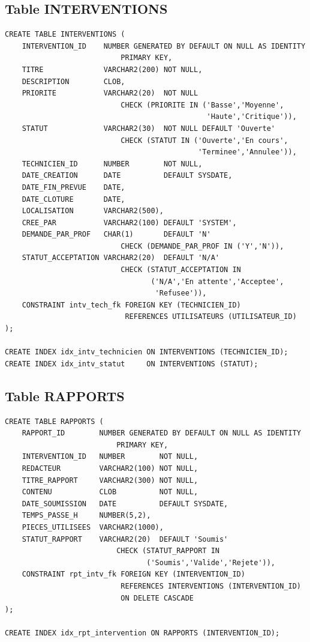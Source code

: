\documentclass[12pt,a4paper,oneside]{report}
\begin{document}
\subsection{Table INTERVENTIONS}

\begin{lstlisting}[language=PLSQL, caption=Création de la table INTERVENTIONS]
CREATE TABLE INTERVENTIONS (
    INTERVENTION_ID    NUMBER GENERATED BY DEFAULT ON NULL AS IDENTITY
                           PRIMARY KEY,
    TITRE              VARCHAR2(200) NOT NULL,
    DESCRIPTION        CLOB,
    PRIORITE           VARCHAR2(20)  NOT NULL
                           CHECK (PRIORITE IN ('Basse','Moyenne',
                                               'Haute','Critique')),
    STATUT             VARCHAR2(30)  NOT NULL DEFAULT 'Ouverte'
                           CHECK (STATUT IN ('Ouverte','En cours',
                                             'Terminee','Annulee')),
    TECHNICIEN_ID      NUMBER        NOT NULL,
    DATE_CREATION      DATE          DEFAULT SYSDATE,
    DATE_FIN_PREVUE    DATE,
    DATE_CLOTURE       DATE,
    LOCALISATION       VARCHAR2(500),
    CREE_PAR           VARCHAR2(100) DEFAULT 'SYSTEM',
    DEMANDE_PAR_PROF   CHAR(1)       DEFAULT 'N'
                           CHECK (DEMANDE_PAR_PROF IN ('Y','N')),
    STATUT_ACCEPTATION VARCHAR2(20)  DEFAULT 'N/A'
                           CHECK (STATUT_ACCEPTATION IN
                                  ('N/A','En attente','Acceptee',
                                   'Refusee')),
    CONSTRAINT intv_tech_fk FOREIGN KEY (TECHNICIEN_ID)
                            REFERENCES UTILISATEURS (UTILISATEUR_ID)
);

CREATE INDEX idx_intv_technicien ON INTERVENTIONS (TECHNICIEN_ID);
CREATE INDEX idx_intv_statut     ON INTERVENTIONS (STATUT);
\end{lstlisting}

\subsection{Table RAPPORTS}

\begin{lstlisting}[language=PLSQL, caption=Création de la table RAPPORTS]
CREATE TABLE RAPPORTS (
    RAPPORT_ID        NUMBER GENERATED BY DEFAULT ON NULL AS IDENTITY
                          PRIMARY KEY,
    INTERVENTION_ID   NUMBER        NOT NULL,
    REDACTEUR         VARCHAR2(100) NOT NULL,
    TITRE_RAPPORT     VARCHAR2(300) NOT NULL,
    CONTENU           CLOB          NOT NULL,
    DATE_SOUMISSION   DATE          DEFAULT SYSDATE,
    TEMPS_PASSE_H     NUMBER(5,2),
    PIECES_UTILISEES  VARCHAR2(1000),
    STATUT_RAPPORT    VARCHAR2(20)  DEFAULT 'Soumis'
                          CHECK (STATUT_RAPPORT IN
                                 ('Soumis','Valide','Rejete')),
    CONSTRAINT rpt_intv_fk FOREIGN KEY (INTERVENTION_ID)
                           REFERENCES INTERVENTIONS (INTERVENTION_ID)
                           ON DELETE CASCADE
);

CREATE INDEX idx_rpt_intervention ON RAPPORTS (INTERVENTION_ID);
\end{lstlisting}
\end{document}

